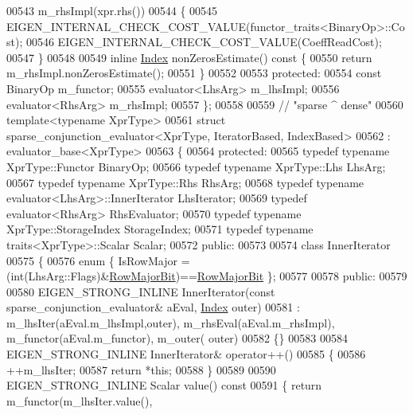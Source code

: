 \begin{DoxyCode}
00543       m\_rhsImpl(xpr.rhs())  
00544   \{
00545     EIGEN\_INTERNAL\_CHECK\_COST\_VALUE(functor\_traits<BinaryOp>::Cost);
00546     EIGEN\_INTERNAL\_CHECK\_COST\_VALUE(CoeffReadCost);
00547   \}
00548   
00549   \textcolor{keyword}{inline} \hyperlink{namespace_eigen_a62e77e0933482dafde8fe197d9a2cfde}{Index} nonZerosEstimate()\textcolor{keyword}{ const }\{
00550     \textcolor{keywordflow}{return} m\_rhsImpl.nonZerosEstimate();
00551   \}
00552 
00553 \textcolor{keyword}{protected}:
00554   \textcolor{keyword}{const} BinaryOp m\_functor;
00555   evaluator<LhsArg> m\_lhsImpl;
00556   evaluator<RhsArg> m\_rhsImpl;
00557 \};
00558 
00559 \textcolor{comment}{// "sparse ^ dense"}
00560 \textcolor{keyword}{template}<\textcolor{keyword}{typename} XprType>
00561 \textcolor{keyword}{struct }sparse\_conjunction\_evaluator<XprType, IteratorBased, IndexBased>
00562   : evaluator\_base<XprType>
00563 \{
00564 \textcolor{keyword}{protected}:
00565   \textcolor{keyword}{typedef} \textcolor{keyword}{typename} XprType::Functor BinaryOp;
00566   \textcolor{keyword}{typedef} \textcolor{keyword}{typename} XprType::Lhs LhsArg;
00567   \textcolor{keyword}{typedef} \textcolor{keyword}{typename} XprType::Rhs RhsArg;
00568   \textcolor{keyword}{typedef} \textcolor{keyword}{typename} evaluator<LhsArg>::InnerIterator LhsIterator;
00569   \textcolor{keyword}{typedef} evaluator<RhsArg> RhsEvaluator;
00570   \textcolor{keyword}{typedef} \textcolor{keyword}{typename} XprType::StorageIndex StorageIndex;
00571   \textcolor{keyword}{typedef} \textcolor{keyword}{typename} traits<XprType>::Scalar Scalar;
00572 \textcolor{keyword}{public}:
00573 
00574   \textcolor{keyword}{class }InnerIterator
00575   \{
00576     \textcolor{keyword}{enum} \{ IsRowMajor = (int(LhsArg::Flags)&\hyperlink{group__flags_gae4f56c2a60bbe4bd2e44c5b19cbe8762}{RowMajorBit})==\hyperlink{group__flags_gae4f56c2a60bbe4bd2e44c5b19cbe8762}{RowMajorBit} \};
00577 
00578   \textcolor{keyword}{public}:
00579     
00580     EIGEN\_STRONG\_INLINE InnerIterator(\textcolor{keyword}{const} sparse\_conjunction\_evaluator& aEval, 
      \hyperlink{namespace_eigen_a62e77e0933482dafde8fe197d9a2cfde}{Index} outer)
00581       : m\_lhsIter(aEval.m\_lhsImpl,outer), m\_rhsEval(aEval.m\_rhsImpl), m\_functor(aEval.m\_functor), m\_outer(
      outer)
00582     \{\}
00583 
00584     EIGEN\_STRONG\_INLINE InnerIterator& operator++()
00585     \{
00586       ++m\_lhsIter;
00587       \textcolor{keywordflow}{return} *\textcolor{keyword}{this};
00588     \}
00589 
00590     EIGEN\_STRONG\_INLINE Scalar value()\textcolor{keyword}{ const}
00591 \textcolor{keyword}{    }\{ \textcolor{keywordflow}{return} m\_functor(m\_lhsIter.value(),

\end{DoxyCode}
